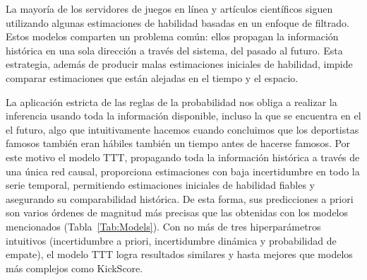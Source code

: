 \documentclass[a4paper,11pt]{book}
\theoremstyle{definition}
\begin{document}
La mayoría de los servidores de juegos en línea y artículos científicos siguen utilizando algunas estimaciones de habilidad basadas en un enfoque de filtrado.
%
%
%
%
Estos modelos comparten un problema común: ellos propagan la información histórica en una sola dirección a través del sistema, del pasado al futuro.
%
Esta estrategia, además de producir malas estimaciones iniciales de habilidad, impide comparar estimaciones que están alejadas en el tiempo y el espacio.

La aplicación estricta de las reglas de la probabilidad nos obliga a realizar la inferencia usando toda la información disponible, incluso la que se encuentra en el el futuro, algo que intuitivamente hacemos cuando concluimos que los deportistas famosos también eran hábiles también un tiempo antes de hacerse famosos.
%
Por este motivo el modelo TTT, propagando toda la informaci\'on hist\'orica a través de una única red causal, proporciona estimaciones con baja incertidumbre en todo la serie temporal, permitiendo estimaciones iniciales de habilidad fiables y asegurando su comparabilidad hist\'orica.
%
De esta forma, sus predicciones a priori son varios \'ordenes de magnitud más precisas que las obtenidas con los modelos mencionados (Tabla~\ref{Tab:Models}).
%
Con no más de tres hiperparámetros intuitivos (incertidumbre a priori, incertidumbre dinámica y probabilidad de empate), el modelo TTT logra resultados similares y hasta mejores que modelos más complejos como KickScore.
\end{document}
